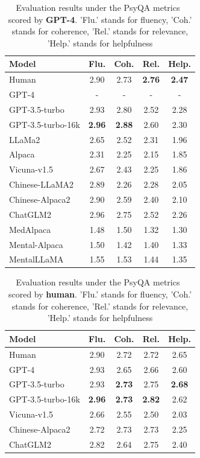 \begin{table}[htbp]
\centering
\footnotesize
\begin{tabular}{l c c c c}
\hline
\textbf{Model} & \textbf{Flu.} & \textbf{Coh.} & \textbf{Rel.} & \textbf{Help.}\\
\hline
Human & 2.90 & 2.73 & \textbf{2.76} & \textbf{2.47}\\
\hline
GPT-4 & - & - & - & -\\
GPT-3.5-turbo & 2.93 & 2.80 & 2.52 & 2.28\\
GPT-3.5-turbo-16k & \textbf{2.96} & \textbf{2.88} & 2.60 & 2.30\\
\hline
LLaMa2 & 2.65 & 2.52 & 2.31 & 1.96\\
Alpaca & 2.31 & 2.25 & 2.15 & 1.85\\
Vicuna-v1.5 & 2.67 & 2.43 & 2.25 & 1.86\\
\hline
Chinese-LLaMA2 & 2.89 & 2.26 & 2.28 & 2.05\\
Chinese-Alpaca2 & 2.90 & 2.59 & 2.40 & 2.10\\
ChatGLM2 & 2.96 & 2.75 & 2.52 & 2.26\\
\hline
MedAlpaca & 1.48 & 1.50 & 1.32 & 1.30\\
Mental-Alpaca & 1.50 & 1.42 & 1.40 & 1.33\\
MentalLLaMA & 1.55 & 1.53 & 1.44 & 1.35\\
\hline
\end{tabular}
\caption{Evaluation results under the PsyQA metrics~\citep{sun-etal-2021-psyqa} scored by \textbf{GPT-4}. 'Flu.' stands for fluency, 'Coh.' stands for coherence, 'Rel.' stands for relevance, 'Help.' stands for helpfulness}
\label{tab: PsyQA metrics gpt4}
\end{table}

\begin{table}[htbp]
\centering
\footnotesize
\begin{tabular}{l c c c c}
\hline
\textbf{Model} & \textbf{Flu.} & \textbf{Coh.} & \textbf{Rel.} & \textbf{Help.}\\
\hline
Human & 2.90 & 2.72 & 2.72 & 2.65\\
\hline
GPT-4 & 2.93 & 2.65 & 2.66 & 2.60\\
GPT-3.5-turbo & 2.93 & \textbf{2.73} & 2.75 & \textbf{2.68}\\
GPT-3.5-turbo-16k & \textbf{2.96} & \textbf{2.73} & \textbf{2.82} & 2.62\\
\hline
Vicuna-v1.5 & 2.66 & 2.55 & 2.50 & 2.03\\
Chinese-Alpaca2 & 2.72 & 2.73 & 2.73 & 2.25\\
ChatGLM2 & 2.82 & 2.64 & 2.75 & 2.40\\
\hline
\end{tabular}
\caption{Evaluation results under the PsyQA metrics~\citep{sun-etal-2021-psyqa} scored by \textbf{human}. 'Flu.' stands for fluency, 'Coh.' stands for coherence, 'Rel.' stands for relevance, 'Help.' stands for helpfulness}
\label{tab: PsyQA metrics human}
\end{table}

